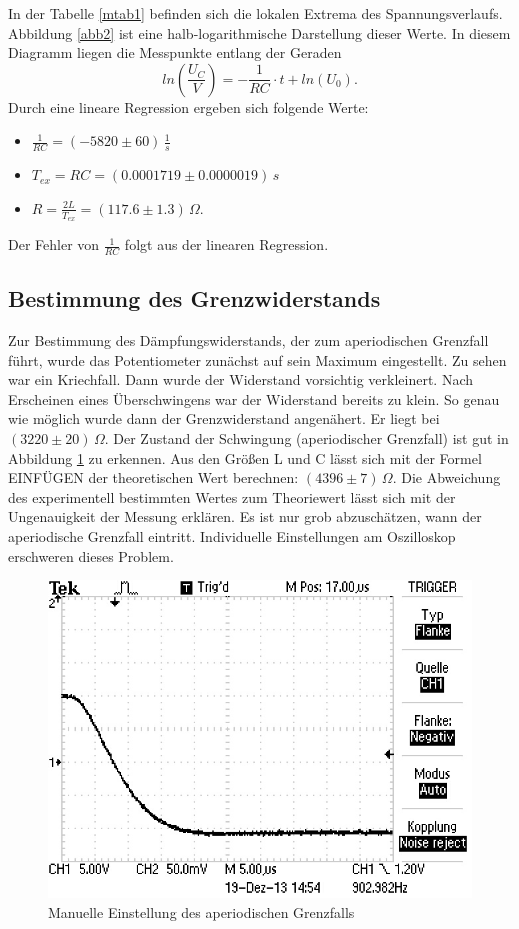 \documentclass[11pt,ngerman,a4paper]{article}
\begin{document}
In der Tabelle \ref{mtab1} befinden sich die lokalen Extrema des Spannungsverlaufs. Abbildung \ref{abb2} ist eine halb-logarithmische Darstellung dieser Werte. In diesem Diagramm liegen die Messpunkte entlang der Geraden
\begin{equation}
ln(\frac{U_C}{V}) = -\frac{1}{RC}\cdot t + ln(U_0).
\end{equation}
Durch eine lineare Regression ergeben sich folgende Werte:
\begin{itemize}
\item $\frac{1}{RC} = (-5820\pm60)\,\frac{1}{s}$
\item $T_{ex} = RC = (0.0001719\pm0.0000019)\, s$
\item $R = \frac{2L}{T_{ex}} = (117.6\pm1.3)\, \Omega$.
\end{itemize}
Der Fehler von $\frac{1}{RC}$ folgt aus der linearen Regression.
\subsection{Bestimmung des Grenzwiderstands}
Zur Bestimmung des Dämpfungswiderstands, der zum aperiodischen Grenzfall führt, wurde das Potentiometer zunächst auf sein Maximum eingestellt. Zu sehen war ein Kriechfall. Dann wurde der Widerstand vorsichtig verkleinert. Nach Erscheinen eines Überschwingens war der Widerstand bereits zu klein. So genau wie möglich wurde dann der Grenzwiderstand angenähert. Er liegt bei $(3220 \pm 20) \, \Omega$. Der Zustand der Schwingung (aperiodischer Grenzfall) ist gut in Abbildung \ref{apgrenzfall} zu erkennen. Aus den Größen L und C lässt sich mit der Formel EINFÜGEN der theoretischen Wert berechnen: $(4396\pm7)\,\Omega$. Die Abweichung des experimentell bestimmten Wertes zum Theoriewert lässt sich mit der Ungenauigkeit der Messung erklären. Es ist nur grob abzuschätzen, wann der aperiodische Grenzfall eintritt. Individuelle Einstellungen am Oszilloskop erschweren dieses Problem.
\begin{figure}[h!]
\centering
\includegraphics[scale=0.5]{apgrenzfall.png}
\caption{Manuelle Einstellung des aperiodischen Grenzfalls}
\label{apgrenzfall}
\end{figure}
\end{document}
